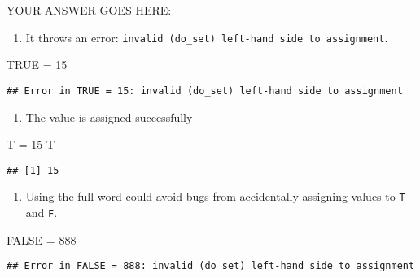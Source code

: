 \documentclass[
]{article}
\newenvironment{Shaded}{\begin{snugshade}}{\end{snugshade}}
\newcommand{\DecValTok}[1]{\textcolor[rgb]{0.00,0.00,0.81}{#1}}
\newcommand{\NormalTok}[1]{#1}
\newcommand{\OtherTok}[1]{\textcolor[rgb]{0.56,0.35,0.01}{#1}}
\newcommand{\StringTok}[1]{\textcolor[rgb]{0.31,0.60,0.02}{#1}}
\providecommand{\tightlist}{%
  \setlength{\itemsep}{0pt}\setlength{\parskip}{0pt}}
\begin{document}
YOUR ANSWER GOES HERE:

\begin{enumerate}
\def\labelenumi{\arabic{enumi}.}
\tightlist
\item
  It throws an error:
  \texttt{invalid\ (do\_set)\ left-hand\ side\ to\ assignment}.
\end{enumerate}

\begin{Shaded}
\begin{Highlighting}[]
\OtherTok{TRUE}\NormalTok{ =}\StringTok{ }\DecValTok{15}
\end{Highlighting}
\end{Shaded}

\begin{verbatim}
## Error in TRUE = 15: invalid (do_set) left-hand side to assignment
\end{verbatim}

\begin{enumerate}
\def\labelenumi{\arabic{enumi}.}
\setcounter{enumi}{1}
\tightlist
\item
  The value is assigned successfully
\end{enumerate}

\begin{Shaded}
\begin{Highlighting}[]
\NormalTok{T =}\StringTok{ }\DecValTok{15}
\NormalTok{T}
\end{Highlighting}
\end{Shaded}

\begin{verbatim}
## [1] 15
\end{verbatim}

\begin{enumerate}
\def\labelenumi{\arabic{enumi}.}
\setcounter{enumi}{2}
\tightlist
\item
  Using the full word could avoid bugs from accidentally assigning
  values to \texttt{T} and \texttt{F}.
\end{enumerate}

\begin{Shaded}
\begin{Highlighting}[]
\OtherTok{FALSE}\NormalTok{ =}\StringTok{ }\DecValTok{888}
\end{Highlighting}
\end{Shaded}

\begin{verbatim}
## Error in FALSE = 888: invalid (do_set) left-hand side to assignment
\end{verbatim}
\end{document}

